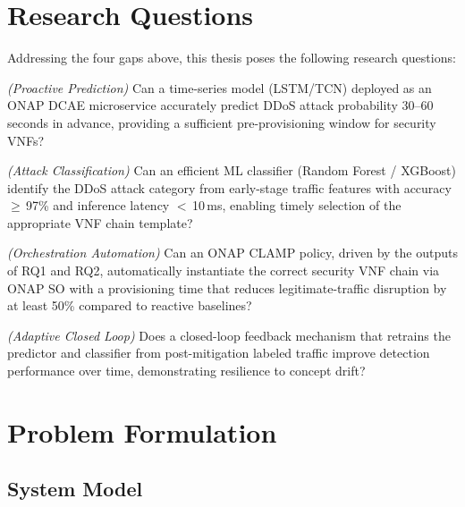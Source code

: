 \documentclass[12pt, a4paper]{article}
\begin{document}
\section{Research Questions}

Addressing the four gaps above, this thesis poses the following research questions:

\begin{description}[leftmargin=1.5cm, labelwidth=1.2cm,
                    font=\normalfont\bfseries\color{onapblue}]

\item[RQ1.] \textit{(Proactive Prediction)} Can a time-series model (LSTM/TCN)
deployed as an ONAP DCAE microservice accurately predict DDoS attack
probability 30--60 seconds in advance, providing a sufficient pre-provisioning
window for security VNFs?

\item[RQ2.] \textit{(Attack Classification)} Can an efficient ML classifier
(Random Forest / XGBoost) identify the DDoS attack category from early-stage
traffic features with accuracy $\geq$\,97\% and inference latency
$<$\,10\,ms, enabling timely selection of the appropriate VNF chain template?

\item[RQ3.] \textit{(Orchestration Automation)} Can an ONAP CLAMP policy,
driven by the outputs of RQ1 and RQ2, automatically instantiate the correct
security VNF chain via ONAP SO with a provisioning time that reduces
legitimate-traffic disruption by at least 50\% compared to reactive baselines?

\item[RQ4.] \textit{(Adaptive Closed Loop)} Does a closed-loop feedback
mechanism that retrains the predictor and classifier from post-mitigation
labeled traffic improve detection performance over time, demonstrating
resilience to concept drift?

\end{description}

\section{Problem Formulation}

\subsection{System Model}
\end{document}
